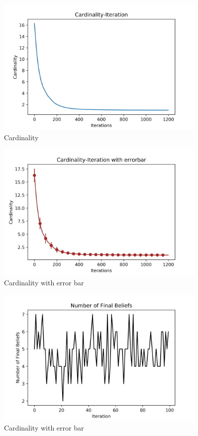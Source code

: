 \documentclass[a4paper,12pt]{article}
\begin{document}
    \begin{figure}[H]
    	\centering
    	\includegraphics[width=0.9\textwidth]{Card50_5_1200_100_3}
    	\caption{Cardinality}\label{Card50_5_1200_100_3_h}
    \end{figure}
    \begin{figure}[H]
    	\centering
    	\includegraphics[width=0.9\textwidth]{CardErr50_5_1200_100_3}
    	\caption{Cardinality with error bar}\label{CardErr50_5_1200_100_3_h}
    \end{figure}
    \begin{figure}[H]
    	\centering
    	\includegraphics[width=0.9\textwidth]{numbef50_5_1200_100_3}
    	\caption{Cardinality with error bar}\label{numbef50_5_1200_100_3}
    \end{figure}
\end{document}
